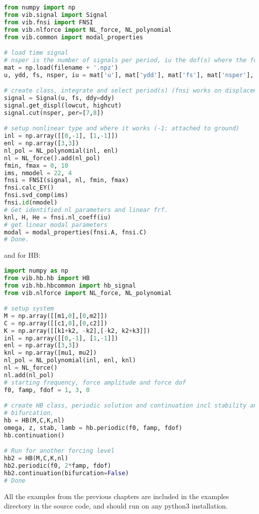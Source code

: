\begin{lstlisting}[language=Python,frame=single,breaklines=true,basicstyle=\tiny]
from numpy import np
from vib.signal import Signal
from vib.fnsi import FNSI
from vib.nlforce import NL_force, NL_polynomial
from vib.common import modal_properties

# load time signal
# nsper is the number of signals per period, iu the dof(s) where the force(s) works
mat = np.load(filename + '.npz')
u, ydd, fs, nsper, iu = mat['u'], mat['ydd'], mat['fs'], mat['nsper'], mat['iu']

# create class, integrate and select period(s) (fnsi works on displacements)
signal = Signal(u, fs, ddy=ddy)
signal.get_displ(lowcut, highcut)
signal.cut(nsper, per=[7,8])

# setup nonlinear type and where it works (-1: attached to ground)
inl = np.array([[0,-1], [1,-1]])
enl = np.array([3,3])
nl_pol = NL_polynomial(inl, enl)
nl = NL_force().add(nl_pol)
fmin, fmax = 0, 10
ims, nmodel = 22, 4
fnsi = FNSI(signal, nl, fmin, fmax)
fnsi.calc_EY()
fnsi.svd_comp(ims)
fnsi.id(nmodel)
# Get identified nl parameters and linear frf.
knl, H, He = fnsi.nl_coeff(iu)
# get linear modal parameters
modal = modal_properties(fnsi.A, fnsi.C)
# Done.
\end{lstlisting}
and for HB:

\begin{lstlisting}[language=Python,frame=single,breaklines=true,basicstyle=\tiny]
import numpy as np
from vib.hb.hb import HB
from vib.hb.hbcommon import hb_signal
from vib.nlforce import NL_force, NL_polynomial

# setup system
M = np.array([[m1,0],[0,m2]])
C = np.array([[c1,0],[0,c2]])
K = np.array([[k1+k2, -k2],[-k2, k2+k3]])
inl = np.array([[0,-1], [1,-1]])
enl = np.array([3,3])
knl = np.array([mu1, mu2])
nl_pol = NL_polynomial(inl, enl, knl)
nl = NL_force()
nl.add(nl_pol)
# starting frequency, force amplitude and force dof
f0, famp, fdof = 1, 3, 0

# create HB class, periodic solution and continuation incl stability and
# bifurcation.
hb = HB(M,C,K,nl)
omega, z, stab, lamb = hb.periodic(f0, famp, fdof)
hb.continuation()

# Run for another forcing level
hb2 = HB(M,C,K,nl)
hb2.periodic(f0, 2*famp, fdof)
hb2.continuation(bifurcation=False)
# Done
\end{lstlisting}

All the examples from the previous chapters are included in the examples
directory in the source code, and should run on any python3 installation.

